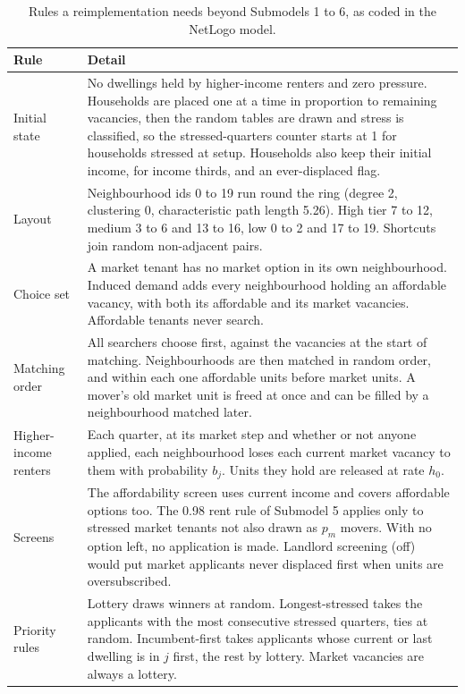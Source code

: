 \documentclass[10pt,a4paper]{article}
\begin{document}
\begin{table}[tp]
\centering
\caption{Rules a reimplementation needs beyond Submodels 1 to 6, as coded in the NetLogo model.}
\label{tab:details}
\footnotesize
\begin{tabular}{L{3.0cm}L{11.5cm}}
\toprule
\textbf{Rule} & \textbf{Detail} \\
\midrule
Initial state & No dwellings held by higher-income renters and zero pressure. Households are placed one at a time in proportion to remaining vacancies, then the random tables are drawn and stress is classified, so the stressed-quarters counter starts at 1 for households stressed at setup. Households also keep their initial income, for income thirds, and an ever-displaced flag. \\
Layout & Neighbourhood ids 0 to 19 run round the ring (degree 2, clustering 0, characteristic path length 5.26). High tier 7 to 12, medium 3 to 6 and 13 to 16, low 0 to 2 and 17 to 19. Shortcuts join random non-adjacent pairs. \\
Choice set & A market tenant has no market option in its own neighbourhood. Induced demand adds every neighbourhood holding an affordable vacancy, with both its affordable and its market vacancies. Affordable tenants never search. \\
Matching order & All searchers choose first, against the vacancies at the start of matching. Neighbourhoods are then matched in random order, and within each one affordable units before market units. A mover's old market unit is freed at once and can be filled by a neighbourhood matched later. \\
Higher-income renters & Each quarter, at its market step and whether or not anyone applied, each neighbourhood loses each current market vacancy to them with probability $b_j$. Units they hold are released at rate $h_0$. \\
Screens & The affordability screen uses current income and covers affordable options too. The 0.98 rent rule of Submodel 5 applies only to stressed market tenants not also drawn as $p_m$ movers. With no option left, no application is made. Landlord screening (off) would put market applicants never displaced first when units are oversubscribed. \\
Priority rules & Lottery draws winners at random. Longest-stressed takes the applicants with the most consecutive stressed quarters, ties at random. Incumbent-first takes applicants whose current or last dwelling is in $j$ first, the rest by lottery. Market vacancies are always a lottery. \\

\end{tabular}
\end{table}
\end{document}
